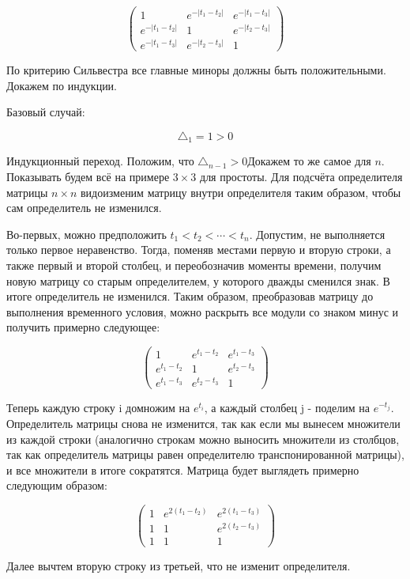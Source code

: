 \documentclass[a4paper,12pt]{article}
\begin{document}
\[ \begin{pmatrix} 
1 & e^{-|t_1 - t_2|} & e^{-|t_1 - t_3|} \\
e^{-|t_1 - t_2|} & 1 & e^{-|t_2 - t_3|}\\
e^{-|t_1 - t_3|} & e^{-|t_2 - t_3|} & 1 
\end{pmatrix}\]

По критерию Сильвестра все главные миноры должны быть положительными. Докажем по индукции. 

Базовый случай:

\[ \triangle_1 = 1 > 0 \]

Индукционный переход. Положим, что $ \triangle_{n-1} > 0 $Докажем то же самое для $ n $. Показывать будем всё на примере $ 3 \times 3 $ для простоты. Для подсчёта определителя матрицы $ n\times n $ видоизменим матрицу внутри определителя таким образом, чтобы сам определитель не изменился. 

Во-первых, можно предположить $ t_1 < t_2 < \cdots < t_n $. Допустим, не выполняется только первое неравенство. Тогда, поменяв местами первую и вторую строки, а также первый и второй столбец, и переобозначив моменты времени, получим новую матрицу со старым определителем, у которого дважды сменился знак. В итоге определитель не изменился. Таким образом, преобразовав матрицу до выполнения временного условия, можно раскрыть все модули со знаком минус и получить примерно следующее:

\[ \begin{pmatrix} 
1 & e^{t_1 - t_2} & e^{t_1 - t_3} \\
e^{t_1 - t_2} & 1 & e^{t_2 - t_3}\\
e^{t_1 - t_3} & e^{t_2 - t_3} & 1 
\end{pmatrix}\]

Теперь каждую строку i домножим на $ e^{t_i} $, а каждый столбец j - поделим на $ e^{-t_j} $. Определитель матрицы снова не изменится, так как если мы вынесем множители из каждой строки (аналогично строкам можно выносить множители из столбцов, так как определитель матрицы равен определителю транспонированной матрицы), и все множители в итоге сократятся. Матрица будет выглядеть примерно следующим образом:

\[ \begin{pmatrix} 
1 & e^{2(t_1 - t_2)} & e^{2(t_1 - t_3)} \\
1 & 1 & e^{2(t_2 - t_3)}\\
1 & 1 & 1 
\end{pmatrix}\]

Далее вычтем вторую строку из третьей, что не изменит определителя.
\end{document}
